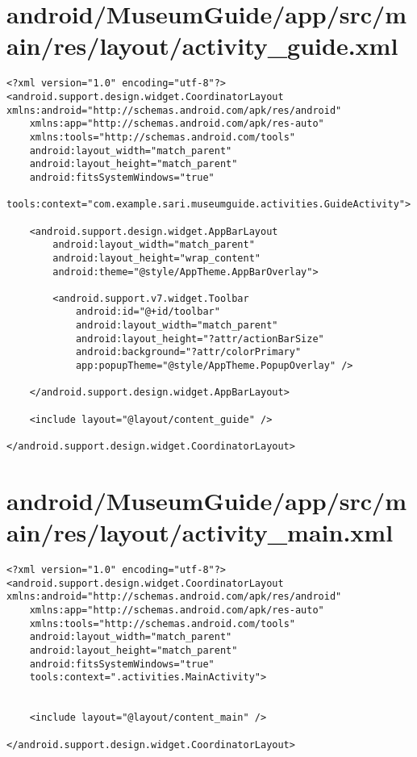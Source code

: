 \section{android/MuseumGuide/app/src/main/res/layout/activity_guide.xml}
\begin{lstlisting}<?xml version="1.0" encoding="utf-8"?>
<android.support.design.widget.CoordinatorLayout xmlns:android="http://schemas.android.com/apk/res/android"
    xmlns:app="http://schemas.android.com/apk/res-auto"
    xmlns:tools="http://schemas.android.com/tools"
    android:layout_width="match_parent"
    android:layout_height="match_parent"
    android:fitsSystemWindows="true"
    tools:context="com.example.sari.museumguide.activities.GuideActivity">

    <android.support.design.widget.AppBarLayout
        android:layout_width="match_parent"
        android:layout_height="wrap_content"
        android:theme="@style/AppTheme.AppBarOverlay">

        <android.support.v7.widget.Toolbar
            android:id="@+id/toolbar"
            android:layout_width="match_parent"
            android:layout_height="?attr/actionBarSize"
            android:background="?attr/colorPrimary"
            app:popupTheme="@style/AppTheme.PopupOverlay" />

    </android.support.design.widget.AppBarLayout>

    <include layout="@layout/content_guide" />

</android.support.design.widget.CoordinatorLayout>
\end{lstlisting}
\newpage
\section{android/MuseumGuide/app/src/main/res/layout/activity_main.xml}
\begin{lstlisting}<?xml version="1.0" encoding="utf-8"?>
<android.support.design.widget.CoordinatorLayout xmlns:android="http://schemas.android.com/apk/res/android"
    xmlns:app="http://schemas.android.com/apk/res-auto"
    xmlns:tools="http://schemas.android.com/tools"
    android:layout_width="match_parent"
    android:layout_height="match_parent"
    android:fitsSystemWindows="true"
    tools:context=".activities.MainActivity">


    <include layout="@layout/content_main" />

</android.support.design.widget.CoordinatorLayout>
\end{lstlisting}
\newpage
